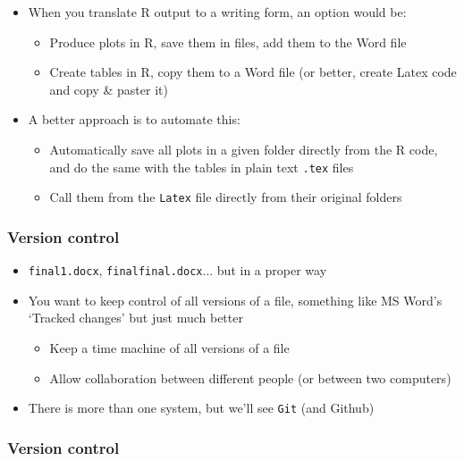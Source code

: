 \documentclass[utf8, xcolor=dvipsnames, handout]{beamer}
\begin{document}
\begin{itemize}
\begin{frame}
\begin{itemize}[<+->]
  \item When you translate R output to a writing form, an option would be:
  \begin{itemize}
    \item Produce plots in R, save them in files, add them to the Word file
    \item Create tables in R, copy them to a Word file (or better, create Latex code and copy \& paster it)
  \end{itemize}
  \item A better approach is to automate this:
  \begin{itemize}
    \item Automatically save all plots in a given folder directly from the R code, and do the same with the tables in plain text \texttt{.tex} files
    \item Call them from the \texttt{Latex} file directly from their original folders
  \end{itemize}
\end{itemize}

\end{frame}

\begin{frame}
\frametitle{Version control}
\centering

\begin{itemize}[<+->]
  \item \texttt{final1.docx}, \texttt{finalfinal.docx}... but in a proper way
  \item You want to keep control of all versions of a file, something like MS Word's `Tracked changes' but just much better
  \begin{itemize}
    \item Keep a time machine of all versions of a file
    \item Allow collaboration between different people (or between two computers)
  \end{itemize}
  \item There is more than one system, but we'll see \texttt{Git} (and Github)
\end{itemize}

\end{frame}

\begin{frame}
\frametitle{Version control}
\centering


\end{frame}
\end{itemize}
\end{document}
